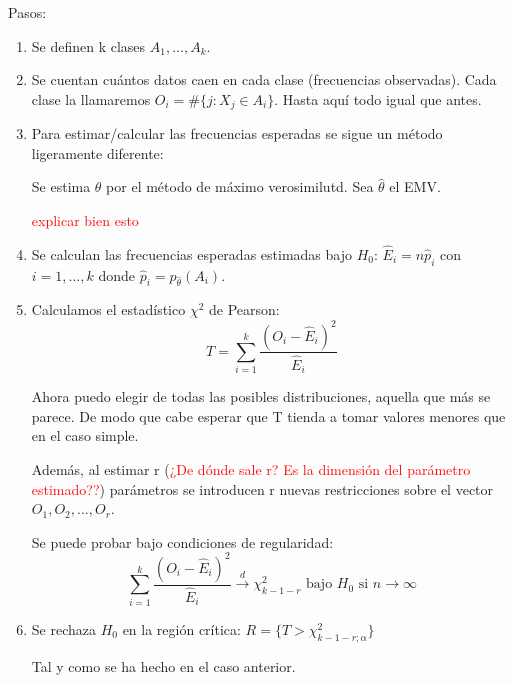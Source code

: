\documentclass[palatino,nochap]{apuntes}
\begin{document}
Pasos:
\begin{enumerate}
\item Se definen k clases $A_1,...,A_k$. 

\item Se cuentan cuántos datos caen en cada clase (frecuencias observadas). Cada clase la llamaremos $O_i=\#\{j:X_j\in A_i\}$. Hasta aquí todo igual que antes.

\item Para estimar/calcular las frecuencias esperadas se sigue un método ligeramente diferente:

Se estima $\theta$ por el método de máximo verosimilutd. Sea $\hat{\theta}$ el EMV.

\textcolor{red}{explicar bien esto}

\item Se calculan las frecuencias esperadas estimadas bajo $H_0$: $\hat{E}_i=n\hat{p}_i$ con $i=1,...,k$ donde $\hat{p}_i = p_{\hat{\theta}}(A_i)$.

\item Calculamos el estadístico $\chi^2$ de Pearson:
\[
T=\sum_{i=1}^k \frac{(O_i-\hat{E}_i)^2}{\hat{E}_i}
\]

Ahora puedo elegir de todas las posibles distribuciones, aquella que más se parece. De modo que cabe esperar que T tienda a tomar valores menores que en el caso simple.

Además, al estimar r (\textcolor{red}{¿De dónde sale r? Es la dimensión del parámetro estimado??}) parámetros se introducen r nuevas restricciones sobre el vector $O_1,O_2,...,O_r$.

Se puede probar bajo condiciones de regularidad:
\[
\sum_{i=1}^k \frac{(O_i-\hat{E}_i)^2}{\hat{E}_i} \stackrel{d}{\rightarrow} \chi^2_{k-1-r} \text{ bajo } H_0 \text{ si } n \rightarrow \infty
\]

\item Se rechaza $H_0$ en la región crítica: $R=\{T>\chi^2_{k-1-r;\alpha}  \}$

Tal y como se ha hecho en el caso anterior.

\end{enumerate}
\end{document}
